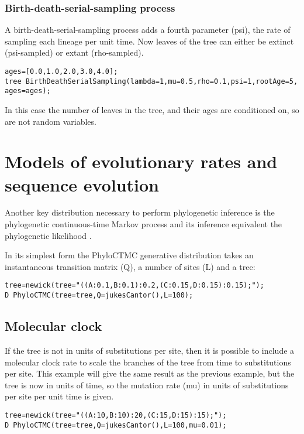 \documentclass[10pt,letterpaper,table]{article}
\begin{document}
{\subsubsection*{Birth-death-serial-sampling process}

A birth-death-serial-sampling \cite{stadler2013dating} process adds a fourth parameter (psi), the rate of sampling each lineage per unit time.
Now leaves of the tree can either be extinct (psi-sampled) or extant (rho-sampled).

\begin{alltt}
  ages = [0.0,1.0,2.0,3.0,4.0];
  tree ~ BirthDeathSerialSampling(lambda=1, mu=0.5, rho=0.1, psi=1, rootAge=5, ages=ages);
\end{alltt}

In this case the number of leaves in the tree, and their ages are conditioned on, so are not random variables.



\section*{Models of evolutionary rates and sequence evolution}

Another key distribution necessary to perform phylogenetic inference
is the phylogenetic continuous-time Markov process and its inference
equivalent the phylogenetic likelihood \cite{felsenstein1981}.

In its simplest form the PhyloCTMC generative
distribution takes an instantaneous transition matrix (Q), a number of sites (L) and a tree:

\begin{alltt}
  tree = newick(tree="((A:0.1,B:0.1):0.2,(C:0.15,D:0.15):0.15);");
  D ~ PhyloCTMC(tree=tree, Q=jukesCantor(), L=100);
\end{alltt}

\subsection*{Molecular clock}

If the tree is not in units of substitutions per site, then it is possible to include a molecular clock rate
to scale the branches of the tree from time to substitutions per site. This example will give the same
result as the previous example, but the tree is now in units of time, so the mutation rate (mu) in units of
substitutions per site per unit time is given.

\begin{alltt}
  tree = newick(tree="((A:10,B:10):20,(C:15,D:15):15);");
  D ~ PhyloCTMC(tree=tree, Q=jukesCantor(), L=100, mu=0.01);
\end{alltt}

}
\end{document}
